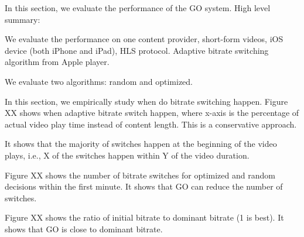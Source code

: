 
In this section, we evaluate the performance of the GO system. High level summary:


We evaluate the performance on one content provider, short-form videos, iOS device (both iPhone and iPad), HLS protocol.
Adaptive bitrate switching algorithm from Apple player.

We evaluate two algorithms: random and optimized.





In this section, we empirically study when do bitrate switching happen. Figure XX shows when adaptive bitrate switch happen, where
x-axis is the percentage of actual video play time instead of content length. This is a conservative approach.

It shows that the majority of switches happen at 
the beginning of the video plays, i.e., X of the switches happen within Y of the video duration. 



Figure XX shows the number of bitrate switches for optimized and random decisions within the first minute. 
It shows that GO can reduce the number of switches.


Figure XX shows the ratio of initial bitrate to dominant bitrate (1 is best). It shows that GO is close to dominant bitrate.
